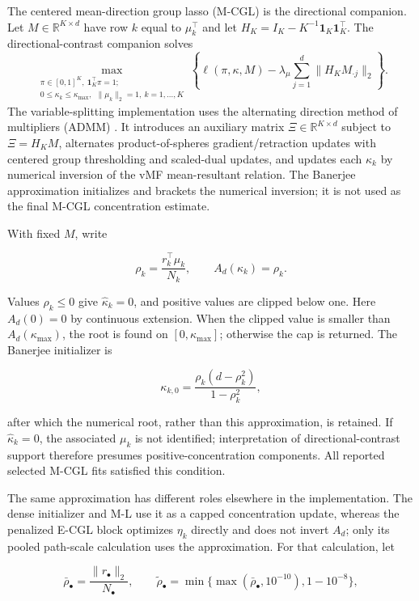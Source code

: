 \documentclass[preprint,12pt,authoryear]{elsarticle}
\begin{document}
The centered mean-direction group lasso (M-CGL) is the directional companion.
Let $M\in\mathbb R^{K\times d}$ have row $k$ equal to $\mu_k^\top$ and let
$H_K=I_K-K^{-1}\mathbf 1_K\mathbf 1_K^\top$. The directional-contrast
companion solves
\[
\max_{\substack{
\pi\in[0,1]^K,\ \mathbf 1_K^\top\pi=1;\\
0\leq\kappa_k\leq\kappa_{\max},\
\ \lVert\mu_k\rVert_2=1,\ k=1,\ldots,K
}}
\left\{
\ell(\pi,\kappa,M)
-
\lambda_\mu\sum_{j=1}^{d}
\lVert H_KM_{\cdot j}\rVert_2
\right\}.
\]
The variable-splitting implementation uses the alternating direction method
of multipliers (ADMM) \citep{boyd2011admm}. It introduces an auxiliary matrix
$\Xi\in\mathbb R^{K\times d}$ subject to $\Xi=H_KM$,
alternates product-of-spheres gradient/retraction updates with centered group
thresholding and scaled-dual updates, and updates each $\kappa_k$ by numerical
inversion of the vMF mean-resultant relation. The Banerjee approximation
initializes and brackets the numerical inversion; it is not used as the final
M-CGL concentration estimate.

With fixed $M$, write

\[
\rho_k=\frac{r_k^\top\mu_k}{N_k},
\qquad
A_d(\kappa_k)=\rho_k.
\]

Values $\rho_k\leq0$ give $\widehat\kappa_k=0$, and positive values are clipped
below one. Here $A_d(0)=0$ by continuous extension. When the clipped value is
smaller than $A_d(\kappa_{\max})$, the root is found on
$[0,\kappa_{\max}]$; otherwise the cap is returned. The Banerjee initializer
\citep{banerjee2005vmf} is

\[
\kappa_{k,0}
=\frac{\rho_k(d-\rho_k^2)}{1-\rho_k^2},
\]

after which the numerical root, rather than this approximation, is retained.
If $\widehat\kappa_k=0$, the associated $\mu_k$ is not identified; interpretation
of directional-contrast support therefore presumes positive-concentration
components. All reported selected M-CGL fits satisfied this condition.

The same approximation has different roles elsewhere in the implementation.
The dense initializer and M-L use it as a capped concentration update, whereas
the penalized E-CGL block optimizes $\eta_k$ directly and does not invert
$A_d$; only its pooled path-scale calculation uses the approximation. For that
calculation, let

\[
\bar\rho_\bullet
=\frac{\lVert r_\bullet\rVert_2}{N_\bullet},
\qquad
\widetilde\rho_\bullet
=\min\{\max(\bar\rho_\bullet,10^{-10}),1-10^{-8}\},
\]
\end{document}
